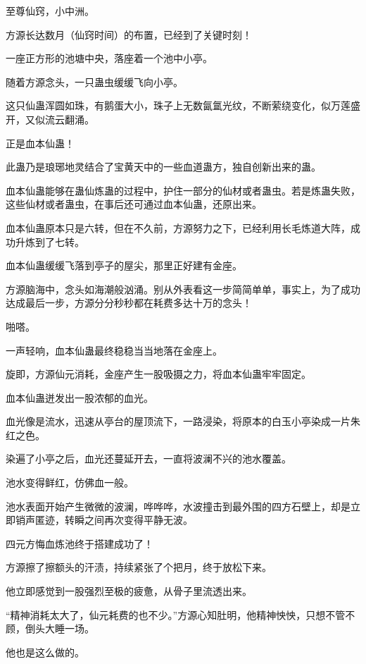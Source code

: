 
\begin{this_body}

至尊仙窍，小中洲。

方源长达数月（仙窍时间）的布置，已经到了关键时刻！

一座正方形的池塘中央，落座着一个池中小亭。

随着方源念头，一只蛊虫缓缓飞向小亭。

这只仙蛊浑圆如珠，有鹅蛋大小，珠子上无数氤氲光纹，不断萦绕变化，似万莲盛开，又似流云翻涌。

正是血本仙蛊！

此蛊乃是琅琊地灵结合了宝黄天中的一些血道蛊方，独自创新出来的蛊。

血本仙蛊能够在蛊仙炼蛊的过程中，护住一部分的仙材或者蛊虫。若是炼蛊失败，这些仙材或者蛊虫，在事后还可通过血本仙蛊，还原出来。

血本仙蛊原本只是六转，但在不久前，方源努力之下，已经利用长毛炼道大阵，成功升炼到了七转。

血本仙蛊缓缓飞落到亭子的屋尖，那里正好建有金座。

方源脑海中，念头如海潮般汹涌。别从外表看这一步简简单单，事实上，为了成功达成最后一步，方源分分秒秒都在耗费多达十万的念头！

啪嗒。

一声轻响，血本仙蛊最终稳稳当当地落在金座上。

旋即，方源仙元消耗，金座产生一股吸摄之力，将血本仙蛊牢牢固定。

血本仙蛊迸发出一股浓郁的血光。

血光像是流水，迅速从亭台的屋顶流下，一路浸染，将原本的白玉小亭染成一片朱红之色。

染遍了小亭之后，血光还蔓延开去，一直将波澜不兴的池水覆盖。

池水变得鲜红，仿佛血一般。

池水表面开始产生微微的波澜，哗哗哗，水波撞击到最外围的四方石壁上，却是立即销声匿迹，转瞬之间再次变得平静无波。

四元方悔血炼池终于搭建成功了！

方源擦了擦额头的汗渍，持续紧张了个把月，终于放松下来。

他立即感觉到一股强烈至极的疲惫，从骨子里流透出来。

“精神消耗太大了，仙元耗费的也不少。”方源心知肚明，他精神怏怏，只想不管不顾，倒头大睡一场。

他也是这么做的。


\end{this_body}

